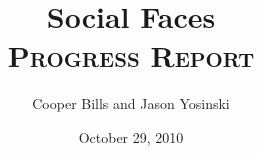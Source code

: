 \documentclass[11pt,letterpaper]{article}
\title{Social Faces\\
\textsc{\normalsize Progress Report}}
\author{Cooper Bills and Jason Yosinski \\
\code{\{csb88,jy495\}@cornell.edu}}
\date{October 29, 2010}
\begin{document}
\maketitle

\begin{abstract}

\end{abstract}




\end{document}
